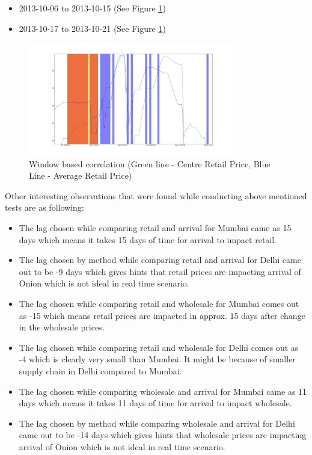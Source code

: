 \documentclass[a4paper,10pt]{report}
\begin{document}
\begin{itemize}
			\begin{itemize}
				\item 2013-10-06 to 2013-10-15 (See Figure \ref{fig:20131006_1015_1021})
				\item 2013-10-17 to 2013-10-21 (See Figure \ref{fig:20131006_1015_1021})
			\end{itemize}
			\begin{figure}[H]
		    	\centering
  		    	\includegraphics[width=0.8\textwidth]{graphs/20131006_1015_1021.png}
		    	\caption{Window based correlation (Green line - Centre Retail Price, Blue Line - Average Retail Price)}
		    	\label{fig:20131006_1015_1021}
			\end{figure}
						
		\end{itemize}
		
		Other interesting observations that were found while conducting above mentioned tests are as following:
		\begin{itemize}
			\item The lag chosen while comparing retail and arrival for Mumbai came as 15 days which means it takes 15 days of time for arrival to impact retail.
			\item The lag chosen by method while comparing retail and arrival for Delhi came out to be -9 days which gives hints that retail prices are impacting arrival of Onion which is not ideal in real time scenario.
			\item The lag chosen while comparing retail and wholesale for Mumbai comes out as -15 which means retail prices are impacted in approx. 15 days after change in the wholesale prices.
			\item The lag chosen while comparing retail and wholesale for Delhi comes out as -4 which is clearly very small than Mumbai. It might be because of smaller supply chain in Delhi compared to Mumbai.
			\item The lag chosen while comparing wholesale and arrival for Mumbai came as 11 days which means it takes 11 days of time for arrival to impact wholesale.
			\item The lag chosen by method while comparing wholesale and arrival for Delhi came out to be -14 days which gives hints that wholesale prices are impacting arrival of Onion which is not ideal in real time scenario.
		\end{itemize}
		
\end{document}
